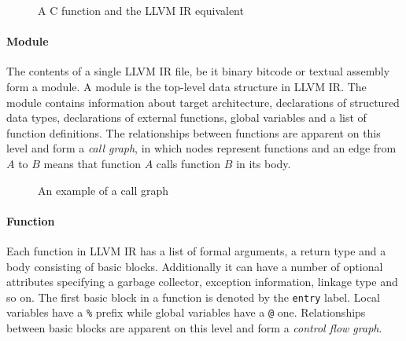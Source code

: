 \begin{figure}[H]
    \centering
    \caption{A C function and the \textsc{LLVM IR} equivalent}
    \label{fig_llvmir}
\end{figure}

\paragraph*{Module} The contents of a single \textsc{LLVM IR} file, be it binary bitcode or textual assembly form a module. A module is the top-level data structure in \textsc{LLVM IR}. The module contains information about target architecture, declarations of structured data types, declarations of external functions, global variables and a list of function definitions. The relationships between functions are apparent on this level and form a \emph{call graph}, in which nodes represent functions and an edge from $A$ to $B$ means that function $A$ calls function $B$ in its body.

\begin{figure}[H]
    \centering
    \caption{An example of a call graph}
    \label{fig_callgraph}
\end{figure}

\paragraph*{Function} Each function in \textsc{LLVM IR} has a list of formal arguments, a return type and a body consisting of basic blocks. Additionally it can have a number of optional attributes specifying a garbage collector, exception information, linkage type and so on. The first basic block in a function is denoted by the \texttt{entry} label. Local variables have a \texttt{\%} prefix while global variables have a \texttt{@} one. Relationships between basic blocks are apparent on this level and form a \emph{control flow graph}.

